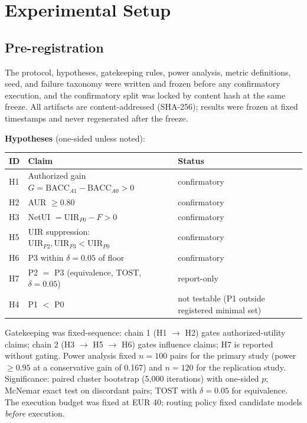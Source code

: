 \section{Experimental Setup}
\label{sec:setup}

\subsection{Pre-registration}

The protocol, hypotheses, gatekeeping rules, power analysis, metric
definitions, seed, and failure taxonomy were written and frozen before any
confirmatory execution, and the confirmatory split was locked by content hash
at the same freeze. All artifacts are content-addressed (SHA-256); results were
frozen at fixed timestamps and never regenerated after the freeze.

\textbf{Hypotheses} (one-sided unless noted):

\begin{center}
\begin{tabular}{@{}l>{\raggedright\arraybackslash}p{1.55in}>{\raggedright\arraybackslash}p{0.95in}@{}}
\toprule
\textbf{ID} & \textbf{Claim} & \textbf{Status} \\
\midrule
H1 & Authorized gain $G = \mathrm{BACC}_{A1}-\mathrm{BACC}_{A0} > 0$ & confirmatory \\
H2 & AUR $\ge 0.80$ & confirmatory \\
H3 & NetUI $= \mathrm{UIR}_{P0} - F > 0$ & confirmatory \\
H5 & UIR suppression: $\mathrm{UIR}_{P2}, \mathrm{UIR}_{P3} < \mathrm{UIR}_{P0}$ & confirmatory \\
H6 & P3 within $\delta = 0.05$ of floor & confirmatory \\
H7 & P2 $=$ P3 (equivalence, TOST, $\delta = 0.05$) & report-only \\
H4 & P1 $<$ P0 & not testable (P1 outside registered minimal set) \\
\bottomrule
\end{tabular}
\end{center}

Gatekeeping was fixed-sequence: chain 1 (H1 $\to$ H2) gates authorized-utility
claims; chain 2 (H3 $\to$ H5 $\to$ H6) gates influence claims; H7 is reported
without gating. Power analysis fixed $n = 100$ pairs for the primary study
(power $\ge 0.95$ at a conservative gain of 0.167) and $n = 120$ for the
replication study. Significance: paired cluster bootstrap (5{,}000 iterations)
with one-sided $p$; McNemar exact test on discordant pairs; TOST with
$\delta = 0.05$ for equivalence. The execution budget was fixed at EUR 40;
routing policy fixed candidate models \emph{before} execution.

